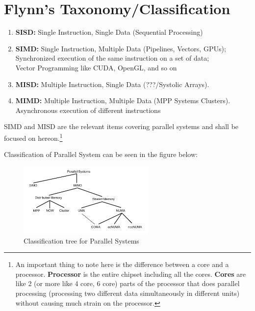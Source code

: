 \documentclass[12pt, a4paper]{report}
\begin{document}
\section{Flynn's Taxonomy/Classification}
\begin{enumerate}[label=(\bfseries \alph*)]
    \item {\bfseries SISD:} Single Instruction, Single Data (Sequential Processing)
    \item {\bfseries SIMD:} Single Instruction, Multiple Data (Pipelines, Vectors, GPUs); \\ \hspace*{1.15cm} Synchronized 
                            execution of the same instruction on a set of data; \\ \hspace*{1.15cm} Vector Programming like
                            CUDA, OpenGL, and so on
    \item {\bfseries MISD:} Multiple Instruction, Single Data (???/Systolic Arrays). 
    \item {\bfseries MIMD:} Multiple Instruction, Multiple Data (MPP Systems Clusters). \\ \hspace*{1.3cm} Asynchronous 
            execution of different instructions
\end{enumerate}

SIMD and MISD are the relevant items covering parallel systems and shall be focused on hereon.\footnote[8]{An important thing to
note here is the difference between a core and a processor. {\bfseries Processor} is the entire chipset including all the 
cores. {\bfseries Cores} are like 2 (or more like 4 core, 6 core) parts of the processor that does parallel processing 
(processing two different data simultaneously in different units) without causing much strain on the processor.} 

Classification of Parallel System can be seen in the figure below:
\begin{figure}[h]
    \centering
    \includegraphics[width=0.60\textwidth]{Parallel_Systems}
    \caption{Classification tree for Parallel Systems}
    \label{fig:ParallelSystems}
\end{figure}
\end{document}
